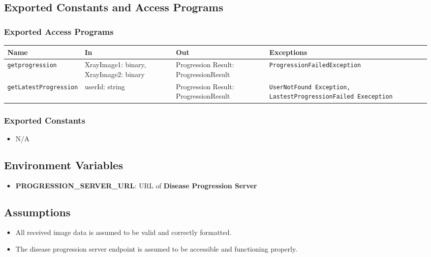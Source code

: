 \documentclass[12pt, titlepage]{article}
\begin{document}
\subsection{Exported Constants and Access Programs}
\subsubsection{Exported Access Programs}
\begin{center}
  \begin{tabular}{|p{4.5cm}|p{2.5cm}|p{3.5cm}|p{6cm}|}
    \hline
    \textbf{Name} & \textbf{In} & \textbf{Out} & \textbf{Exceptions} \\
    \hline
    \texttt{getprogression} & XrayImage1: binary, \newline XrayImage2: binary & Progression Result: \newline ProgressionResult & \texttt{ProgressionFailedException} \\
    \hline
    \texttt{getLatestProgression} & userId: string & Progression Result: \newline ProgressionResult & \texttt{UserNotFound Exception, LastestProgressionFailed Exeception} \\
    \hline
  \end{tabular}
\end{center}

\subsubsection{Exported Constants}
\begin{itemize}
    \item N/A
\end{itemize}

\subsection{Environment Variables}
\begin{itemize}
  \item \textbf{PROGRESSION\_SERVER\_URL}: URL of \textbf{Disease Progression Server}

\end{itemize}

\subsection{Assumptions}
\begin{itemize}
    \item All received image data is assumed to be valid and correctly formatted.
    \item The disease progression server endpoint is assumed to be accessible and functioning properly.
\end{itemize}
\end{document}
